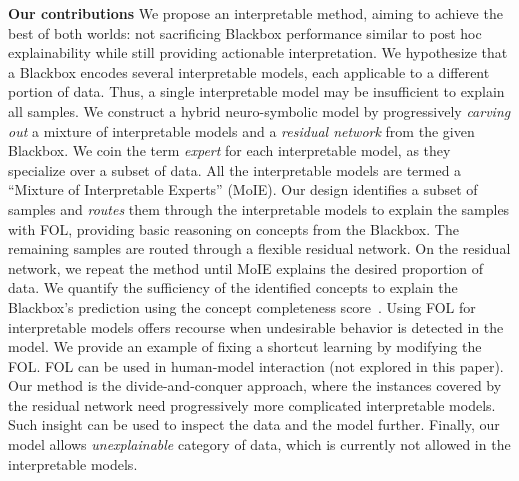 \textbf{Our contributions}
We propose an interpretable method, aiming to achieve the best of both worlds: not sacrificing Blackbox performance similar to post hoc explainability while still providing actionable interpretation. We hypothesize that a Blackbox encodes several interpretable models, each applicable to a different portion of data. Thus, a single interpretable model may be insufficient to explain all samples. We construct a hybrid neuro-symbolic model by progressively \emph{carving out} a mixture of interpretable models and a \emph{residual network} from the given Blackbox. We coin the term \emph{expert} for each interpretable model, as they specialize over a subset of data. All the interpretable models are termed a ``Mixture of Interpretable Experts'' (MoIE). Our design identifies a subset of samples and \emph{routes} them through the interpretable models to explain the samples with FOL, providing basic reasoning on concepts from the Blackbox. The remaining samples are routed through a flexible residual network. 
On the residual network, we repeat the method until MoIE explains the desired proportion of data.
We quantify the sufficiency of the identified concepts to explain the Blackbox’s prediction using the concept completeness score~\cite{yeh2019concept}.
Using FOL for interpretable models offers recourse when undesirable behavior is detected in the model. We provide an example of fixing a shortcut learning by modifying the FOL. FOL can be used in human-model interaction (not explored in this paper). Our method is the divide-and-conquer approach, where the instances covered by the residual network need progressively more complicated interpretable models. Such insight can be used to inspect the data and the model further. Finally, our model allows \emph{unexplainable} category of data, which is currently not allowed in the interpretable models.  

